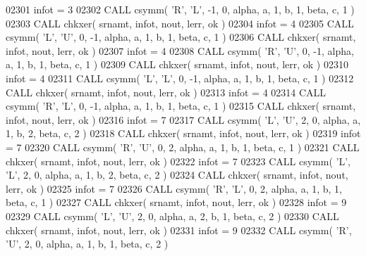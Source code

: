 \begin{DoxyCode}
02301       infot = 3
02302       \textcolor{keyword}{CALL }csymm( \textcolor{stringliteral}{'R'}, \textcolor{stringliteral}{'L'}, -1, 0, alpha, a, 1, b, 1, beta, c, 1 )
02303       \textcolor{keyword}{CALL }chkxer( srnamt, infot, nout, lerr, ok )
02304       infot = 4
02305       \textcolor{keyword}{CALL }csymm( \textcolor{stringliteral}{'L'}, \textcolor{stringliteral}{'U'}, 0, -1, alpha, a, 1, b, 1, beta, c, 1 )
02306       \textcolor{keyword}{CALL }chkxer( srnamt, infot, nout, lerr, ok )
02307       infot = 4
02308       \textcolor{keyword}{CALL }csymm( \textcolor{stringliteral}{'R'}, \textcolor{stringliteral}{'U'}, 0, -1, alpha, a, 1, b, 1, beta, c, 1 )
02309       \textcolor{keyword}{CALL }chkxer( srnamt, infot, nout, lerr, ok )
02310       infot = 4
02311       \textcolor{keyword}{CALL }csymm( \textcolor{stringliteral}{'L'}, \textcolor{stringliteral}{'L'}, 0, -1, alpha, a, 1, b, 1, beta, c, 1 )
02312       \textcolor{keyword}{CALL }chkxer( srnamt, infot, nout, lerr, ok )
02313       infot = 4
02314       \textcolor{keyword}{CALL }csymm( \textcolor{stringliteral}{'R'}, \textcolor{stringliteral}{'L'}, 0, -1, alpha, a, 1, b, 1, beta, c, 1 )
02315       \textcolor{keyword}{CALL }chkxer( srnamt, infot, nout, lerr, ok )
02316       infot = 7
02317       \textcolor{keyword}{CALL }csymm( \textcolor{stringliteral}{'L'}, \textcolor{stringliteral}{'U'}, 2, 0, alpha, a, 1, b, 2, beta, c, 2 )
02318       \textcolor{keyword}{CALL }chkxer( srnamt, infot, nout, lerr, ok )
02319       infot = 7
02320       \textcolor{keyword}{CALL }csymm( \textcolor{stringliteral}{'R'}, \textcolor{stringliteral}{'U'}, 0, 2, alpha, a, 1, b, 1, beta, c, 1 )
02321       \textcolor{keyword}{CALL }chkxer( srnamt, infot, nout, lerr, ok )
02322       infot = 7
02323       \textcolor{keyword}{CALL }csymm( \textcolor{stringliteral}{'L'}, \textcolor{stringliteral}{'L'}, 2, 0, alpha, a, 1, b, 2, beta, c, 2 )
02324       \textcolor{keyword}{CALL }chkxer( srnamt, infot, nout, lerr, ok )
02325       infot = 7
02326       \textcolor{keyword}{CALL }csymm( \textcolor{stringliteral}{'R'}, \textcolor{stringliteral}{'L'}, 0, 2, alpha, a, 1, b, 1, beta, c, 1 )
02327       \textcolor{keyword}{CALL }chkxer( srnamt, infot, nout, lerr, ok )
02328       infot = 9
02329       \textcolor{keyword}{CALL }csymm( \textcolor{stringliteral}{'L'}, \textcolor{stringliteral}{'U'}, 2, 0, alpha, a, 2, b, 1, beta, c, 2 )
02330       \textcolor{keyword}{CALL }chkxer( srnamt, infot, nout, lerr, ok )
02331       infot = 9
02332       \textcolor{keyword}{CALL }csymm( \textcolor{stringliteral}{'R'}, \textcolor{stringliteral}{'U'}, 2, 0, alpha, a, 1, b, 1, beta, c, 2 )

\end{DoxyCode}
